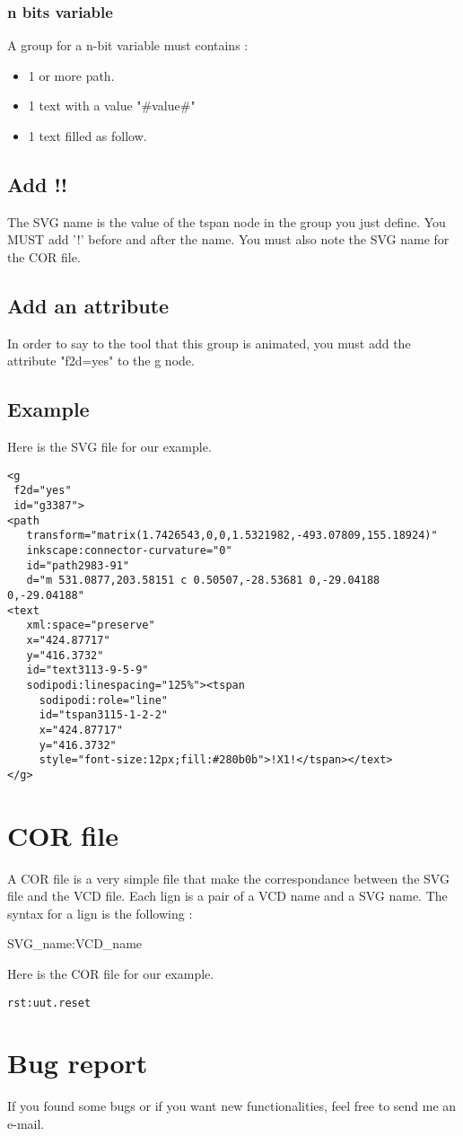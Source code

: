 \documentclass{article}
\begin{document}
\subsubsection{n bits variable}
A group for a n-bit variable must contains : 
\begin{itemize}
\item 1 or more path.
\item 1 text with a value "\#value\#"
\item 1 text filled as follow.
\end{itemize}
\subsection{Add !!}
The SVG name is  the value of the tspan node in the group you just define. You MUST add '!' before and after the name. You must also note the SVG name for
the COR file.
\subsection{Add an attribute}
In order to say to the tool that this group is animated, you must add the attribute "f2d=yes" to the g node.
\subsection{Example}
Here is the SVG file for our example.
\begin{lstlisting}
<g
 f2d="yes"
 id="g3387">
<path
   transform="matrix(1.7426543,0,0,1.5321982,-493.07809,155.18924)"
   inkscape:connector-curvature="0"
   id="path2983-91"
   d="m 531.0877,203.58151 c 0.50507,-28.53681 0,-29.04188 0,-29.04188"
<text
   xml:space="preserve"
   x="424.87717"
   y="416.3732"
   id="text3113-9-5-9"
   sodipodi:linespacing="125%"><tspan
	 sodipodi:role="line"
	 id="tspan3115-1-2-2"
	 x="424.87717"
	 y="416.3732"
	 style="font-size:12px;fill:#280b0b">!X1!</tspan></text>
</g>
\end{lstlisting}

\section{COR file}
A COR file is a very simple file that make the correspondance between the SVG file and the VCD file. Each lign is a pair of a VCD name and a SVG name. The syntax for
a lign is the following :
\begin{center}
SVG\_name:VCD\_name
\end{center}
Here is the COR file for our example.
\begin{lstlisting}
rst:uut.reset
\end{lstlisting}

\section{Bug report}
If you found some bugs or if you want new functionalities, feel free to send me an e-mail. 
\end{document}
